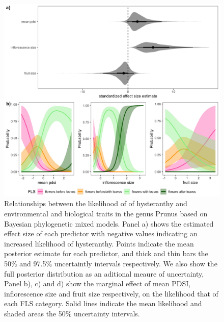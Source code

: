 \documentclass{article}[11pt]
\begin{document}
\begin{figure}[h!]
    \centering
 \includegraphics[width=\textwidth]{..//..//Plots/fullprunus_4manu.jpeg} %
    \caption{Relationships between the likelihood of of hysteranthy and environmental and biological traits in the genus Prunus based on Bayesian phylogenetic mixed models. Panel a) shows the estimated effect size of each predictor with negative values indicating an increased likelihood of hysteranthy. Points indicate the mean posterior estimate for each predictor, and thick and thin bars the 50\% and 97.5\% uncertaintly intervals respectively. We also show the full posterior distribution as an aditional meaure of uncertainty, Panel b), c) and d) show the marginal effect of mean PDSI, inflorescence size and fruit size respectively, on the likelihood that of each FLS category. Solid lines indicate the mean likelihood and shaded areas the 50\% uncertainty intervals.}
    \label{fig:genus}
\end{figure}

\end{document}
